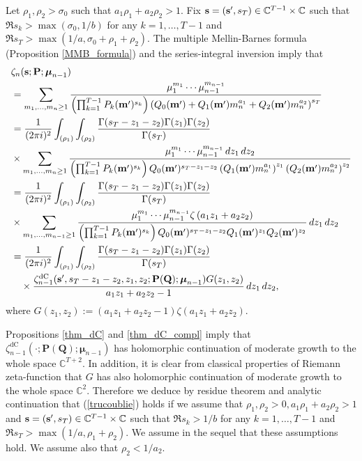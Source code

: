 \documentclass[a4paper,12pt]{article}
\theoremstyle{definition}
\numberwithin{equation}{section}
\def\C{{\mathbb C}}
\def\s{{\bf s}}
\def\m{{\bf m}}
\def\P{{\bf P}}
\newcommand{\mub}{\boldsymbol{\mu}}
\newcommand{\dc}{\mathrm{dC}}
\newcommand{\dd}{d}
\newcommand{\ii}{i}
\let\ds=\displaystyle
\begin{document}
Let $\rho_1, \rho_2 >\sigma_0$ such that $a_1\rho_1+a_2\rho_2 >1$.
Fix $\s=(\s', s_T) \in \C^{T-1}\times \C$ such that $\Re s_k >\max (\sigma_0,1/b)$ for any $k=1,\ldots, T-1$ and 
$\Re s_T >\max(1/a,\sigma_0+\rho_1+\rho_2) $. 
The multiple Mellin-Barnes formula (Proposition \ref{MMB_formula}) and the series-integral inversion imply that
\begin{align}\label{trucoublie}
&\zeta_n(\s;\P;\mub_{n-1})\notag\\
&=\sum_{m_1, \ldots, m_n\geq 1}
\frac{\mu_1^{m_1} \cdots \mu_{n-1}^{m_{n-1}}}{\left(\prod_{k=1}^{T-1} P_k(\m')^{s_k}\right)\left(Q_0(\m')+Q_1(\m')m_n^{a_1}+Q_2(\m')m_n^{a_2}\right)^{s_T}}\notag\\
&= \frac{1}{(2\pi \ii)^2} \int_{(\rho_1)}\int_{(\rho_2)}\frac{\Gamma (s_T-z_1-z_2) \Gamma (z_1) \Gamma (z_2)}{\Gamma (s_T)} 
\notag\\
& \times \sum_{m_1, \ldots, m_n\geq 1}\frac{\mu_1^{m_1} \cdots \mu_{n-1}^{m_{n-1}} \, \dd z_1 \, \dd z_2}{\left(\prod_{k=1}^{T-1} P_k(\m')^{s_k}\right) Q_0(\m')^{s_T-z_1-z_2} \left( Q_1(\m') m_n^{a_1}\right)^{z_1} 
\left( Q_2(\m') m_n^{a_2}\right)^{z_2}}\notag\\
&= \frac{1}{(2\pi \ii)^2} \int_{(\rho_1)}\int_{(\rho_2)}\frac{\Gamma (s_T-z_1-z_2) \Gamma (z_1) \Gamma (z_2)}{\Gamma (s_T)} 
\notag\\
& \times \sum_{m_1, \ldots, m_{n-1}\geq 1}\frac{\mu_1^{m_1}\cdots \mu_{n-1}^{m_{n-1}} \zeta \left( a_1 z_1+ a_2 z_2\right) }{\left(\prod_{k=1}^{T-1} P_k(\m')^{s_k}\right) Q_0(\m')^{s_T-z_1-z_2} Q_1(\m')^{z_1} Q_2(\m')^{z_2}} \, \dd z_1 \, \dd z_2 \notag\\
&= \frac{1}{(2\pi \ii)^2} \int_{(\rho_1)}\int_{(\rho_2)}\frac{\Gamma (s_T-z_1-z_2) \Gamma (z_1) \Gamma (z_2)}{\Gamma (s_T)} 
\notag\\
&  \quad \times \frac{\zeta_{n-1}^{\dc}(\s', s_T-z_1-z_2, z_1, z_2; \mathbf{P(Q)};\boldsymbol{\mu}_{n-1})
 G(z_1, z_2)}{ a_1 z_1+ a_2 z_2-1} \,
\dd z_1 \, \dd z_2,
\end{align}
where $\ds G(z_1, z_2) := \left( a_1 z_1+ a_2 z_2-1\right) \zeta \left(a_1 z_1+ a_2 z_2\right).$

Propositions \ref{thm_dC} and \ref{thm_dC_compl} imply that $\zeta_{n-1}^{\dc}(\cdot; \mathbf{P(Q)};\boldsymbol{\mu}_{n-1} )$ has holomorphic continuation of moderate growth to the whole space $\C^{T+2}$. In addition, it is clear from classical properties of Riemann zeta-function that $G$ has also holomorphic continuation of moderate growth to the whole space $\C^2$.
Therefore
we deduce by residue theorem and analytic continuation that (\ref{trucoublie}) holds if we assume that 
$\rho_1, \rho_2 >0, a_1 \rho_1 +a_2\rho_2 >1$ and $\s=(\s', s_T) \in \C^{T-1}\times \C$ such that $\Re s_k >1/b$ for any $k=1,\ldots, T-1$ and 
$\Re s_T >\max(1/a,\rho_1+\rho_2) $. 
We assume in the sequel that these assumptions hold. We assume also that $\rho_2<1/a_2$.
\end{document}
